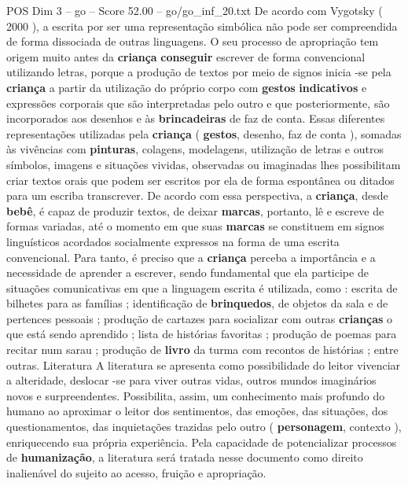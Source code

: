 \begin{textsample}{POS Dim 3 – go – Score 52.00 – go/go\_inf\_20.txt}
De acordo com Vygotsky ( 2000 ), a escrita por ser uma representação simbólica não pode ser compreendida de forma dissociada de outras linguagens.
O seu processo de apropriação tem origem muito antes da \textbf{criança} \textbf{conseguir} escrever de forma convencional utilizando letras, porque a produção de textos por meio de signos inicia -se pela \textbf{criança} a partir da utilização do próprio corpo com \textbf{gestos} \textbf{indicativos} e expressões corporais que são interpretadas pelo outro e que posteriormente, são incorporados aos desenhos e às \textbf{brincadeiras} de faz de conta.
Essas diferentes representações utilizadas pela \textbf{criança} ( \textbf{gestos}, desenho, faz de conta ), somadas às vivências com \textbf{pinturas}, colagens, modelagens, utilização de letras e outros símbolos, imagens e situações vividas, observadas ou imaginadas lhes possibilitam criar textos orais que podem ser escritos por ela de forma espontânea ou ditados para um escriba transcrever.
De acordo com essa perspectiva, a \textbf{criança}, desde \textbf{bebê}, é capaz de produzir textos, de deixar \textbf{marcas}, portanto, lê e escreve de formas variadas, até o momento em que suas \textbf{marcas} se constituem em signos linguísticos acordados socialmente expressos na forma de uma escrita convencional.
Para tanto, é preciso que a \textbf{criança} perceba a importância e a necessidade de aprender a escrever, sendo fundamental que ela participe de situações comunicativas em que a linguagem escrita é utilizada, como : escrita de bilhetes para as famílias ; identificação de \textbf{brinquedos}, de objetos da sala e de pertences pessoais ; produção de cartazes para socializar com outras \textbf{crianças} o que está sendo aprendido ; lista de histórias favoritas ; produção de poemas para recitar num sarau ; produção de \textbf{livro} da turma com recontos de histórias ; entre outras.
Literatura A literatura se apresenta como possibilidade do leitor vivenciar a alteridade, deslocar -se para viver outras vidas, outros mundos imaginários novos e surpreendentes.
Possibilita, assim, um conhecimento mais profundo do humano ao aproximar o leitor dos sentimentos, das emoções, das situações, dos questionamentos, das inquietações trazidas pelo outro ( \textbf{personagem}, contexto ), enriquecendo sua própria experiência.
Pela capacidade de potencializar processos de \textbf{humanização}, a literatura será tratada nesse documento como direito inalienável do sujeito ao acesso, fruição e apropriação.

\end{textsample}
